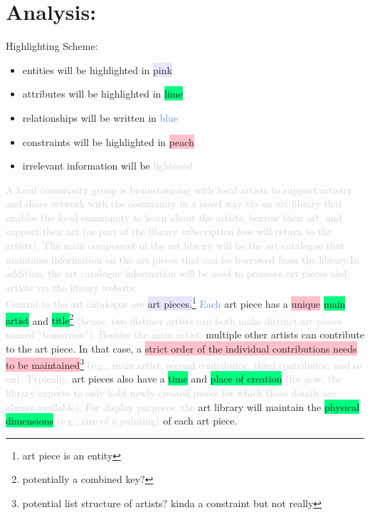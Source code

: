 \documentclass[11pt]{article}
\begin{document}
\section*{Analysis:}

Highlighting Scheme:
\begin{itemize}
    \item entities will be highlighted in \colorbox{Lavender}{pink}
    \item attributes will be highlighted in \colorbox{SpringGreen}{lime}
    \item relationships will be written in \textcolor{CornflowerBlue}{blue} 
    \item constraints will be highlighted in \colorbox{pink}{peach}
    \item irrelevant information will be \textcolor{lightgray}{lightened}
\end{itemize}

\textcolor{lightgray}{A local community group is brainstorming with local artists to support artistry and share artwork with the community in a novel way via an art library that enables the local community to learn about the artists, borrow their art, and support their art (as part of the library subscription fees will return to the artists). The main component of the art library will be the art catalogue that maintains information on the art pieces that can be borrowed from the library.In addition, the art catalogue information will be used to promote art pieces and artists via the library website.} \\

\textcolor{lightgray}{Central to the art catalogue are} \colorbox{Lavender}{art pieces.}\footnote{art piece is an entity} \textcolor{CornflowerBlue}{Each} art piece has a \colorbox{pink}{unique} \colorbox{SpringGreen}{main artist} and \colorbox{SpringGreen}{title}\footnote{potentially a combined key?} \textcolor{lightgray}{(hence, two distinct artists can both make distinct art pieces named “tomorrow”). Besides the main artist,} multiple other artists can contribute to the art piece. In that case, a \colorbox{pink}{strict order of the individual contributions needs to be maintained}\footnote{potential list structure of artists? kinda a constraint but not really} \textcolor{lightgray}{(e.g., main artist, second contributor, third contributor, and so on). Typically,} art pieces also have a \colorbox{SpringGreen}{time} and \colorbox{SpringGreen}{place of creation} \textcolor{lightgray}{(for now, the library expects to only hold newly created pieces for which these details are always available). For display purposes, the} art library will maintain the \colorbox{SpringGreen}{physical dimensions} \textcolor{lightgray}{(e.g., size of a painting)} of each art piece. \\
\end{document}

